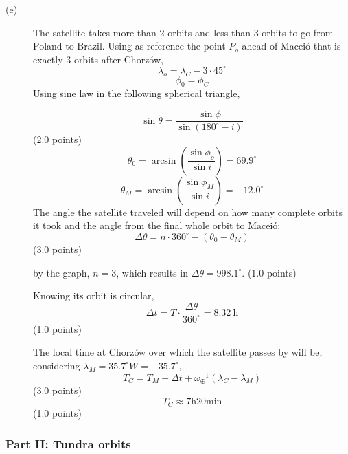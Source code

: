 \begin{description}
\item[(e)] The satellite takes more than 2 orbits and less than 3 orbits to go
  from Poland to Brazil. Using as reference the point $P_o$ ahead of Macei\'o
  that is exactly 3 orbits after Chorz\'ow,
  \[
    \lambda_o = \lambda_C - 3\cdot45^\circ
  \]
  \[
    \phi_0 = \phi_C
  \]
  Using sine law in the following spherical triangle,


  \[
    \sin\theta = \frac{\sin\phi}{\sin(180^\circ - i)}
  \]
  \hfill(2.0 points)
  \[
    \theta_0 = \arcsin\left(\frac{\sin\phi_o}{\sin i}\right) = 69.9^\circ
  \]
  \[
    \theta_M = \arcsin\left(\frac{\sin\phi_M}{\sin i}\right) = -12.0^\circ
  \]
  The angle the satellite traveled will depend on how many complete orbits it
  took and the angle from the final whole orbit to Macei\'o:
  \[
    \Delta\theta = n\cdot360^\circ - (\theta_0 - \theta_M)
  \]
  \hfill(3.0 points)

  by the graph, $n = 3$, which results in $\Delta\theta = 998.1^\circ$.
  \hfill(1.0 points)

  Knowing its orbit is circular,
  \[
    \Delta t = T\cdot\frac{\Delta\theta}{360^\circ} = 8.32\ \mathrm{h}
  \]
  \hfill(1.0 points)

  The local time at Chorz\'ow over which the satellite passes by will be,
  considering $\lambda_M = 35.7^\circ W = -35.7^\circ$,
  \[
    T_C = T_M - \Delta t + \omega_\oplus^{-1}(\lambda_C - \lambda_M)
  \]
  \hfill(3.0 points)
  \[
    \boxed{T_C \approx 7\mathrm{h}20\mathrm{min}}
  \]
  \hfill(1.0 points)
\end{description}

\subsubsection*{Part II: Tundra orbits}

